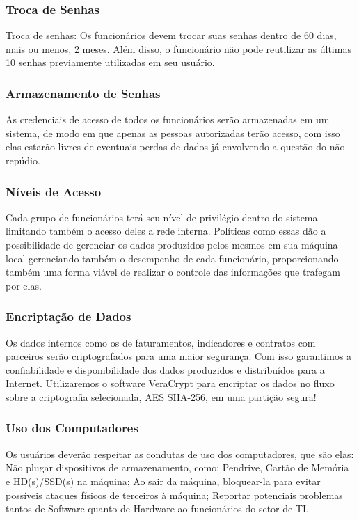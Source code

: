 \documentclass[12pt]{article}
\begin{document}
\subsubsection{Troca de Senhas}
Troca de senhas: Os funcionários devem trocar suas senhas dentro de 60 dias, mais ou menos, 2 meses. Além disso, o funcionário não pode reutilizar as últimas 10 senhas previamente utilizadas em seu usuário.

\subsubsection{Armazenamento de Senhas}
As credenciais de acesso de todos os funcionários serão armazenadas em um sistema, de modo em que apenas as pessoas autorizadas terão acesso, com isso elas estarão livres de eventuais perdas de dados já envolvendo a questão do não repúdio.

\subsubsection{Níveis de Acesso}
Cada grupo de funcionários terá seu nível de privilégio dentro do sistema limitando também o acesso deles a rede interna. Políticas como essas dão a possibilidade de gerenciar os dados produzidos pelos mesmos em sua máquina local gerenciando também o desempenho de cada funcionário, proporcionando também uma forma viável de realizar o controle das informações que trafegam por elas.

\subsubsection{Encriptação de Dados}
Os dados internos como os de faturamentos, indicadores e contratos com parceiros serão criptografados para uma maior segurança. Com isso garantimos a confiabilidade e disponibilidade dos dados produzidos e distribuídos para a Internet. Utilizaremos o software VeraCrypt para encriptar os dados no fluxo sobre a criptografia selecionada, AES SHA-256, em uma partição segura!

\subsubsection{Uso dos Computadores}
Os usuários deverão respeitar as condutas de uso dos computadores, que são elas: Não plugar dispositivos de armazenamento, como: Pendrive, Cartão de Memória e HD(s)/SSD(s) na máquina; Ao sair da máquina, bloquear-la para evitar possíveis ataques físicos de terceiros à máquina; Reportar potenciais problemas tantos de Software quanto de Hardware ao funcionários do setor de TI.
\end{document}
